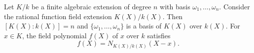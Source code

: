 Let $K/k$ be a finite algebraic extension of degree $n$ with basis $\omega_1, \dots, \omega_n$. Consider the rational function field extension $K(X)/k(X)$. Then $[K(X):k(X)] = n$ and $\{\omega_1, \dots, \omega_n\}$ is a basis of $K(X)$ over $k(X)$. For $x \in K$, the field polynomial $f(X)$ of $x$ over $k$ satisfies
$$f(X) = N_{K(X)/k(X)}(X - x).$$
